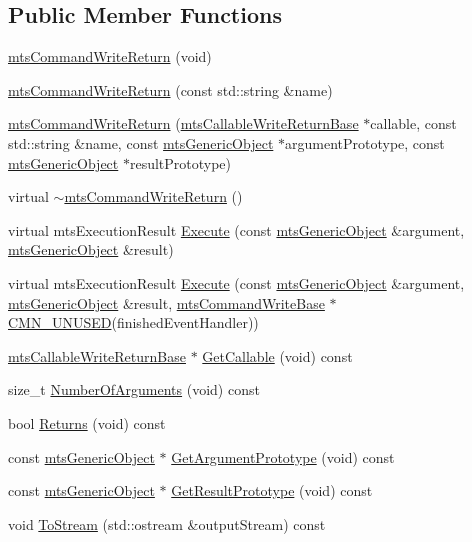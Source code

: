 \subsection*{Public Member Functions}
\begin{DoxyCompactItemize}
\item 
\hyperlink{classmts_command_write_return_a75d7e811da35c3d35a5381d81a723c47}{mts\+Command\+Write\+Return} (void)
\item 
\hyperlink{classmts_command_write_return_a0a42bcea06e94e241b7ee5947db9516b}{mts\+Command\+Write\+Return} (const std\+::string \&name)
\item 
\hyperlink{classmts_command_write_return_a9a99d50207c9f07bd1b1bfe1e5d17ea6}{mts\+Command\+Write\+Return} (\hyperlink{classmts_callable_write_return_base}{mts\+Callable\+Write\+Return\+Base} $\ast$callable, const std\+::string \&name, const \hyperlink{classmts_generic_object}{mts\+Generic\+Object} $\ast$argument\+Prototype, const \hyperlink{classmts_generic_object}{mts\+Generic\+Object} $\ast$result\+Prototype)
\item 
virtual \hyperlink{classmts_command_write_return_a8ef9183a99d604da8e0397728eef559b}{$\sim$mts\+Command\+Write\+Return} ()
\item 
virtual mts\+Execution\+Result \hyperlink{classmts_command_write_return_ad836d1667d7fde4f697ce63e69e0551a}{Execute} (const \hyperlink{classmts_generic_object}{mts\+Generic\+Object} \&argument, \hyperlink{classmts_generic_object}{mts\+Generic\+Object} \&result)
\item 
virtual mts\+Execution\+Result \hyperlink{classmts_command_write_return_a83c18f90db8e763b0d001036e0733f66}{Execute} (const \hyperlink{classmts_generic_object}{mts\+Generic\+Object} \&argument, \hyperlink{classmts_generic_object}{mts\+Generic\+Object} \&result, \hyperlink{classmts_command_write_base}{mts\+Command\+Write\+Base} $\ast$\hyperlink{cmn_portability_8h_a021894e2626935fa2305434b1e893ff6}{C\+M\+N\+\_\+\+U\+N\+U\+S\+E\+D}(finished\+Event\+Handler))
\item 
\hyperlink{classmts_callable_write_return_base}{mts\+Callable\+Write\+Return\+Base} $\ast$ \hyperlink{classmts_command_write_return_ac4b99a5f03b3a1f0f47171b242be6ede}{Get\+Callable} (void) const 
\item 
size\+\_\+t \hyperlink{classmts_command_write_return_aee8e85348044dd4e5b033951bc5e06d9}{Number\+Of\+Arguments} (void) const 
\item 
bool \hyperlink{classmts_command_write_return_a8c026dc9a27616a9ed5714b43ffb9e98}{Returns} (void) const 
\item 
const \hyperlink{classmts_generic_object}{mts\+Generic\+Object} $\ast$ \hyperlink{classmts_command_write_return_a6332f4612d821a195472d4a36be4303f}{Get\+Argument\+Prototype} (void) const 
\item 
const \hyperlink{classmts_generic_object}{mts\+Generic\+Object} $\ast$ \hyperlink{classmts_command_write_return_aab5e107d3cd4837b8820e91089b38400}{Get\+Result\+Prototype} (void) const 
\item 
void \hyperlink{classmts_command_write_return_a6e30a4119ea2ef2466c0f3b46479cc3e}{To\+Stream} (std\+::ostream \&output\+Stream) const 
\end{DoxyCompactItemize}
